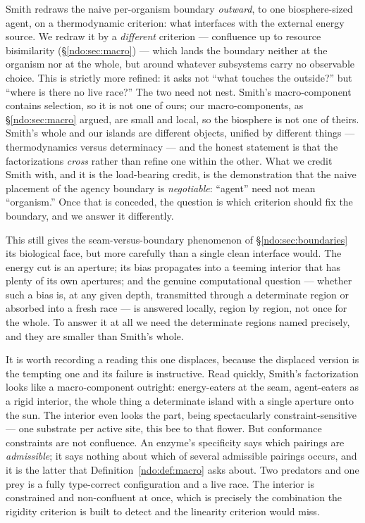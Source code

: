 \begin{remark}\label{ndo:rmk:refine}
Smith redraws the naive per-organism boundary \emph{outward}, to one biosphere-sized
agent, on a thermodynamic criterion: what interfaces with the external energy source.
We redraw it by a \emph{different} criterion --- confluence up to resource bisimilarity
(\S\ref{ndo:sec:macro}) --- which lands the boundary neither at the organism nor at the
whole, but around whatever subsystems carry no observable choice. This is strictly more
refined: it asks not ``what touches the outside?'' but ``where is there no live race?''
The two need not nest. Smith's macro-component contains selection, so it is not one of
ours; our macro-components, as \S\ref{ndo:sec:macro} argued, are small and local, so the
biosphere is not one of theirs. Smith's whole and our islands are different objects,
unified by different things --- thermodynamics versus determinacy --- and the honest
statement is that the factorizations \emph{cross} rather than refine one within the
other. What we credit Smith with, and it is the load-bearing credit, is the
demonstration that the naive placement of the agency boundary is \emph{negotiable}:
``agent'' need not mean ``organism.'' Once that is conceded, the question is which
criterion should fix the boundary, and we answer it differently.
\end{remark}

\noindent
This still gives the seam-versus-boundary phenomenon of \S\ref{ndo:sec:boundaries} its
biological face, but more carefully than a single clean interface would. The energy cut
is an aperture; its bias propagates into a teeming interior that has plenty of its own
apertures; and the genuine computational question --- whether such a bias is, at any
given depth, transmitted through a determinate region or absorbed into a fresh race ---
is answered locally, region by region, not once for the whole. To answer it at all we
need the determinate regions named precisely, and they are smaller than Smith's whole.


\begin{remark}\label{ndo:rmk:earlier}
It is worth recording a reading this one displaces, because the displaced version is
the tempting one and its failure is instructive. Read quickly, Smith's factorization
looks like a macro-component outright: energy-eaters at the seam, agent-eaters as a
rigid interior, the whole thing a determinate island with a single aperture onto the
sun. The interior even looks the part, being spectacularly constraint-sensitive ---
one substrate per active site, this bee to that flower. But conformance constraints
are not confluence. An enzyme's specificity says which pairings are \emph{admissible};
it says nothing about which of several admissible pairings occurs, and it is the latter
that Definition~\ref{ndo:def:macro} asks about. Two predators and one prey is a fully
type-correct configuration and a live race. The interior is constrained and
non-confluent at once, which is precisely the combination the rigidity criterion is
built to detect and the linearity criterion would miss.
\end{remark}

